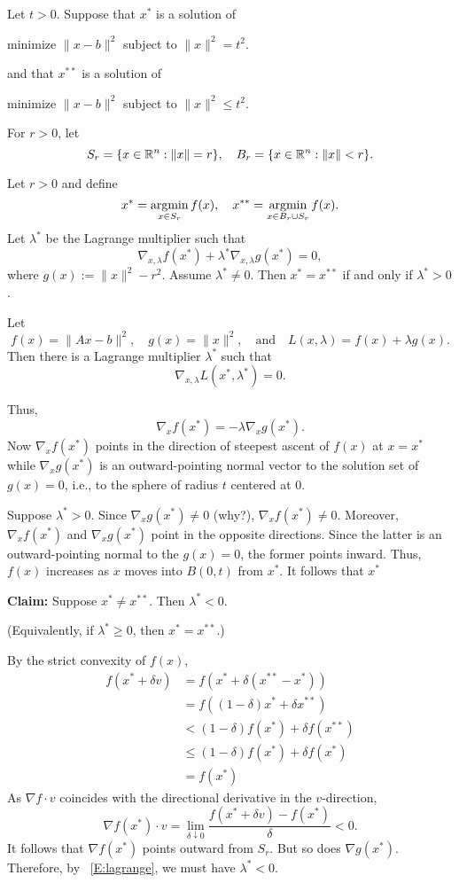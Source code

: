 \documentclass[12pt]{amsart}
\begin{document}
Let $t>0$. Suppose that $x^*$ is a solution of
\begin{center}
    minimize $\|x - b\|^2$ subject to $\|x\|^2=t^2$.
\end{center}
and that $x^{**}$ is a solution of
\begin{center}
    minimize $\|x - b\|^2$ subject to $\|x\|^2\leq t^2$.
\end{center}
For $r>0$, let
\[
    S_r = \{x\in\mathbb{R}^n : \|x\|=r\},\quad 
    B_r = \{x\in\mathbb{R}^n : \|x\|< r\}.
\]
\begin{theorem}
    Let $r>0$ and define
    \[
        x^* = \operatorname*{argmin}_{x\in S_r}f(x),\quad
        x^{**} = \operatorname*{argmin}_{x\in B_r\cup S_r}f(x).
    \]
    Let $\lambda^*$ be the Lagrange multiplier such that
    \[
        \nabla_{x,\lambda} f(x^*) + \lambda^*\nabla_{x,\lambda} g(x^*)=0,
    \]
    where $g(x):= \|x\|^2 - r^2$. Assume $\lambda^*\neq 0$.
    Then $x^*=x^{**}$ if and only if $\lambda^*>0$.

\end{theorem}
Let
\[
    f(x) = \|Ax-b\|^2,\quad
    g(x)=\|x\|^2,\quad\text{and}\quad
    L(x,\lambda)=f(x) + \lambda g(x).
\]
Then there is a Lagrange multiplier $\lambda^*$ such that
\[
    \nabla_{x, \lambda} L(x^*,\lambda^*) = 0.
\]

Thus,
\begin{equation}\label{E:lagrange}
    \nabla_x f(x^*) = -\lambda\nabla_xg(x^*).
\end{equation}
Now $\nabla_x f(x^*)$ points in the direction of steepest ascent of
$f(x)$ at $x=x^*$ while $\nabla_x g(x^*)$ is an outward-pointing
normal vector to the solution set of $g(x)=0$, i.e., to the sphere
of radius $t$ centered at $0$.

Suppose $\lambda^*> 0$. Since $\nabla_x g(x^*)\neq 0$ (why?),
$\nabla_xf(x^*)\neq 0$. Moreover, $\nabla_x f(x^*)$ and $\nabla_x g(x^*)$
point in the opposite directions. Since the latter is an outward-pointing
normal to the $g(x)=0$, the former points inward.
Thus, $f(x)$ increases as $x$ moves into $B(0, t)$ from $x^*$.
It follows that $x^*$



\textbf{Claim:}
Suppose $x^*\neq x^{**}$.
Then $\lambda^* < 0$.

(Equivalently, if $\lambda^*\geq 0$, then $x^* = x^{**}$.)



By the strict convexity of $f(x)$,
\begin{align*}
    f(x^* + \delta v) &= f(x^* + \delta (x^{**} - x^*))\\
    & = f((1-\delta)x^* + \delta x^{**})\\
    & < (1-\delta) f(x^*) + \delta f(x^{**})\\
    & \leq (1-\delta) f(x^*) + \delta f(x^*)\\
    & = f(x^*)
\end{align*}
As $\nabla f\cdot v$ coincides with the directional derivative in the $v$-direction,
\[
    \nabla f(x^*)\cdot v = \lim_{\delta\downarrow 0}\frac{f(x^* + \delta v) - f(x^*)}\delta < 0.
\]
It follows that $\nabla f(x^*)$ points outward from $S_r$.
But so does $\nabla g(x^*)$.
Therefore, by ~\eqref{E:lagrange}, we must have $\lambda^* < 0$.
\end{document}

